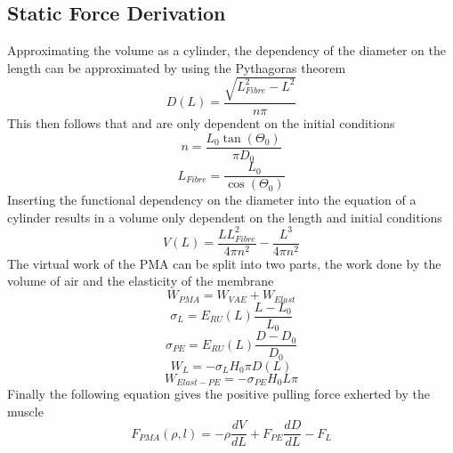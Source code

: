 \documentclass[11pt,a4paper]{article}
\begin{document}
\clearpage
\begin{appendices}
\section{Static Force Derivation}
\label{sub:staticforcederive}
Approximating the volume as a cylinder, the dependency of the diameter on the length can be approximated by using the Pythagoras theorem 
\begin{equation}
    D(L) = \frac{\sqrt{L_{Fibre}^2-L^2}}{n \pi}
\end{equation}
This then follows that  and  are only dependent on the initial conditions
\begin{equation}
    n = \frac{L_0\tan(\Theta_0)}{\pi D_0}
    \label{math:diameterconst1}
\end{equation}
\begin{equation}
    L_{Fibre} = \frac{L_0}{\cos(\Theta_0)}
    \label{math:diameterconst2}
\end{equation}
Inserting the functional dependency on the diameter into the equation of a cylinder results in a volume only dependent on the length and initial conditions
\begin{equation}
    V(L) = \frac{L L_{Fibre}^2}{4 \pi n^2}-\frac{L^3}{4 \pi n^2}
\end{equation}
The virtual work of the PMA can be split into two parts, the work done by the volume of air and the elasticity of the membrane 
\begin{equation}
    W_{PMA} = W_{VAE} + W_{Elast}
\end{equation}
\begin{equation}
    \sigma_{L} = E_{RU}(L) \frac{L-L_0}{L_0}
\end{equation}
\begin{equation}
    \sigma_{PE} = E_{RU}(L) \frac{D-D_0}{D_0}
\end{equation}
\begin{equation}
    W_{L} = -\sigma_{L} H_0 \pi D(L)
\end{equation}
\begin{equation}
    W_{Elast-PE} = -\sigma_{PE} H_0 L \pi
\end{equation}
Finally the following equation gives the positive pulling force exherted by the muscle
\begin{equation}
    F_{PMA}(\rho, l) = -\rho \frac{dV}{dL}+F_{PE} \frac{dD}{dL}-F_L
    \label{math:staticforcederive}
\end{equation}


\end{appendices}
\end{document}
